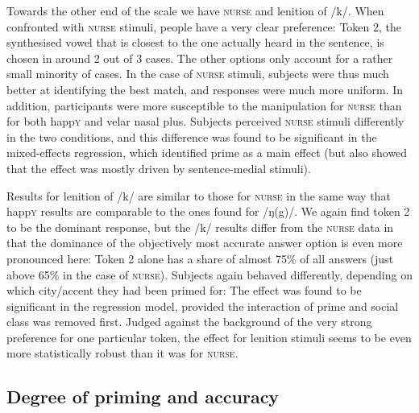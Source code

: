 Towards the other end of the scale we have \textsc{nurse} and lenition of /k/.
When confronted with \textsc{nurse} stimuli, people have a very clear preference: Token 2, the synthesised vowel that is closest to the one actually heard in the sentence, is chosen in around 2 out of 3 cases.
The other options only account for a rather small minority of cases.
In the case of \textsc{nurse} stimuli, subjects were thus much better at identifying the best match, and responses were much more uniform.
In addition, participants were more susceptible to the  manipulation for \textsc{nurse} than for both happ\textsc{y} and velar nasal plus.
Subjects perceived \textsc{nurse} stimuli differently in the two  conditions, and this difference was found to be significant in the mixed-effects regression, which identified prime as a main effect (but also showed that the effect was mostly driven by sentence-medial stimuli).

Results for lenition of /k/ are similar to those for \textsc{nurse} in the same way that happ\textsc{y} results are comparable to the ones found for /ŋ(g)/.
We again find token 2 to be the dominant response, but the /k/ results differ from the \textsc{nurse} data in that the dominance of the objectively most accurate answer option is even more pronounced here: Token 2 alone has a share of almost 75\% of all answers (just above 65\% in the case of \textsc{nurse}).
Subjects again behaved differently, depending on which city/accent they had been primed for: The  effect was found to be significant in the regression model, provided the interaction of prime and social class was removed first.
Judged against the background of the very strong preference for one particular token, the  effect for lenition stimuli seems to be even more statistically robust than it was for \textsc{nurse}.

		\subsection{Degree of priming and accuracy}

